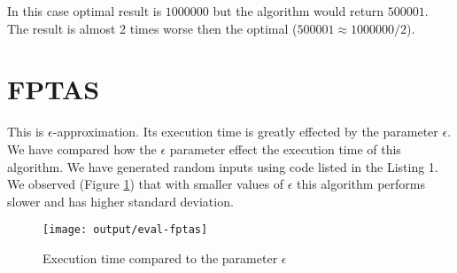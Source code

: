 \documentclass[a4paper,11pt]{article}
\theoremstyle{mytheor}
\begin{document}
In this case optimal result is $1000000$ but the algorithm would return $500001$. The result is almost 2 times worse then the optimal ($500001 \approx 1000000/2$).

\section{FPTAS}

This is $\epsilon$-approximation. Its execution time is greatly effected by the parameter $\epsilon$. We have compared how the $\epsilon$ parameter effect the execution time of this algorithm. We have generated random inputs using code listed in the Listing 1. We observed (Figure \ref{img:eval-fptas}) that with smaller values of $\epsilon$ this algorithm performs slower and has higher standard deviation. 

\begin{figure}[H]
  \texttt{[image: output/eval-fptas]}
  \centering
  \caption{Execution time compared to the parameter $\epsilon$}
  \label{img:eval-fptas}
\end{figure}

\newpage

\end{document}
